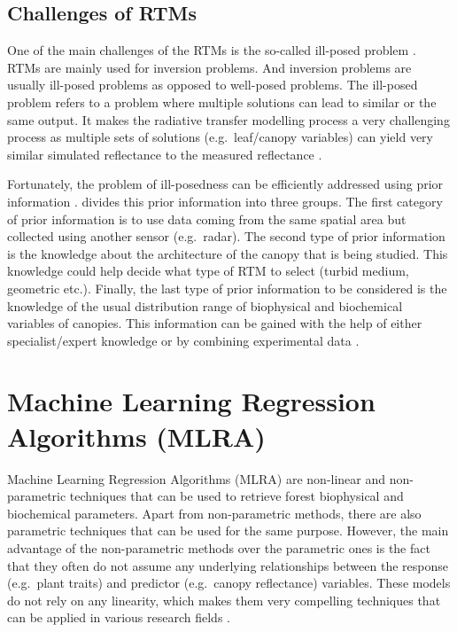 \documentclass[a4paper, twoside]{templates/ociamthesis}
\begin{document}
\hypertarget{chrtm}{%
\subsection{Challenges of RTMs}\label{chrtm}}

One of the main challenges of the RTMs is the so-called ill-posed problem \citep{combal2003retrieval, zhu2019estimation}. RTMs are mainly used for inversion problems. And inversion problems are usually ill-posed problems as opposed to well-posed problems. The ill-posed problem refers to a problem where multiple solutions can lead to similar or the same output. It makes the radiative transfer modelling process a very challenging process as multiple sets of solutions (e.g.~leaf/canopy variables) can yield very similar simulated reflectance to the measured reflectance \citep{combal2003retrieval, darvishzadeh2008estimation, zhu2019estimation}.

Fortunately, the problem of ill-posedness can be efficiently addressed using prior information \citep{combal2003retrieval, darvishzadeh2008estimation, zhu2019estimation}. \citet{combal2003retrieval} divides this prior information into three groups. The first category of prior information is to use data coming from the same spatial area but collected using another sensor (e.g.~radar). The second type of prior information is the knowledge about the architecture of the canopy that is being studied. This knowledge could help decide what type of RTM to select (turbid medium, geometric etc.). Finally, the last type of prior information to be considered is the knowledge of the usual distribution range of biophysical and biochemical variables of canopies. This information can be gained with the help of either specialist/expert knowledge or by combining experimental data \citep{combal2003retrieval}.

\hypertarget{mlra}{%
\section{Machine Learning Regression Algorithms (MLRA)}\label{mlra}}

Machine Learning Regression Algorithms (MLRA) are non-linear and non-parametric techniques that can be used to retrieve forest biophysical and biochemical parameters. Apart from non-parametric methods, there are also parametric techniques that can be used for the same purpose. However, the main advantage of the non-parametric methods over the parametric ones is the fact that they often do not assume any underlying relationships between the response (e.g.~plant traits) and predictor (e.g.~canopy reflectance) variables. These models do not rely on any linearity, which makes them very compelling techniques that can be applied in various research fields \citep{sinha2020estimation, rivera2015emulator, verrelst2019quantifying}.
\end{document}
